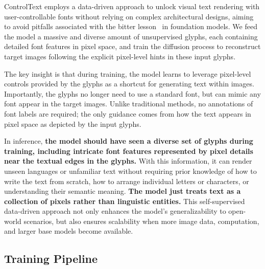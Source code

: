 ControlText employs a data-driven approach to unlock visual text rendering with user-controllable fonts without relying on complex architectural designs, aiming to avoid pitfalls associated with the bitter lesson~\cite{sutton2019bitter} in foundation models. We feed the model a massive and diverse amount of unsupervised glyphs, each containing detailed font features in pixel space, and train the diffusion process to reconstruct target images following the explicit pixel-level hints in these input glyphs.

The key insight is that during training, the model learns to leverage pixel-level controls provided by the glyphs as a shortcut for generating text within images. Importantly, the glyphs no longer need to use a standard font, but can mimic any font appear in the target images. Unlike traditional methods, no annotations of font labels are required; the only guidance comes from how the text appears in pixel space as depicted by the input glyphs.

In inference, \textbf{the model should have seen a diverse set of glyphs during training, including intricate font features represented by pixel details near the textual edges in the glyphs.} With this information, it can render unseen languages or unfamiliar text without requiring prior knowledge of how to write the text from scratch, how to arrange individual letters or characters, or understanding their semantic meaning. \textbf{The model just treats text as a collection of pixels rather than linguistic entities.} This self-supervised data-driven approach not only enhances the model's generalizability to open-world scenarios, but also ensures scalability when more image data, computation, and larger base models become available.


\subsection{Training Pipeline}

